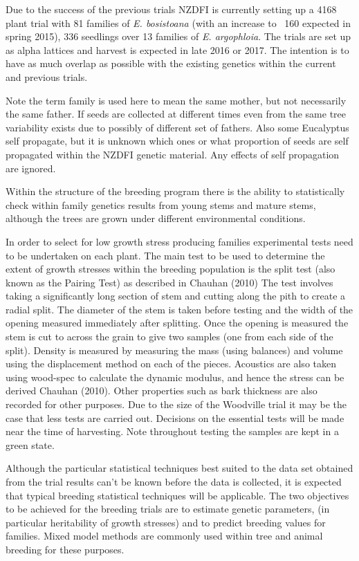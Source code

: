 \documentclass{article}
\begin{document}
Due to the success of the previous trials NZDFI is currently setting up a 4168
plant trial with 81 families of \textit{E. bosistoana} (with an increase to ~160
expected in spring 2015), 336 seedlings over 13 families of \textit{E.
argophloia}. The trials are set up as alpha lattices and harvest is expected in
late 2016 or 2017. The intention is to have as much overlap as possible with the
existing genetics within the current and previous trials.

Note the term family is used here to mean the same mother, but not necessarily
the same father. If seeds are collected at different times even from the same
tree variability exists due to possibly of different set of fathers. Also some
Eucalyptus self propagate, but it is unknown which ones or what proportion of
seeds are self propagated within the NZDFI genetic material. Any effects of self
propagation are ignored.

Within the structure of the breeding program there is the ability to
statistically check within family genetics results from young stems and mature
stems, although the trees are grown under different environmental conditions.

In order to select for low growth stress producing families experimental tests
need to be undertaken on each plant. The main test to be used to determine the
extent of growth stresses within the breeding population is the split test (also
known as the Pairing Test) as described in Chauhan (2010) The test involves
taking a significantly long section of stem and cutting along the pith to create
a radial split. The diameter of the stem is taken before testing and the width
of the opening measured immediately after splitting. Once the opening is
measured the stem is cut to across the grain to give two samples (one from each
side of the split). Density is measured by measuring the mass (using balances)
and volume using the displacement method on each of the pieces. Acoustics are
also taken using wood-spec to calculate the dynamic modulus, and hence the
stress can be derived Chauhan (2010). Other properties such as bark thickness
are also recorded for other purposes. Due to the size of the Woodville trial it
may be the case that less tests are carried out. Decisions on the essential
tests will be made near the time of harvesting. Note throughout testing the
samples are kept in a green state.

Although the particular statistical techniques best suited to the data set
obtained from the trial results can’t be known before the data is collected, it
is expected that typical breeding statistical techniques will be applicable. The
two objectives to be achieved for the breeding trials are to estimate genetic
parameters, (in particular heritability of growth stresses) and to predict
breeding values for families. Mixed model methods are commonly used within tree
and animal breeding for these purposes.
\end{document}
